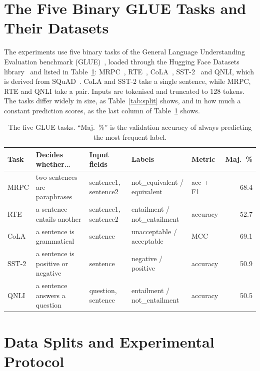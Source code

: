 \section{The Five Binary GLUE Tasks and Their Datasets}

The experiments use five binary tasks of the General Language Understanding Evaluation benchmark (GLUE)~\cite{wang2019glue}, loaded through the Hugging Face Datasets library~\cite{lhoest2021datasets} and listed in Table~\ref{tab:data}: MRPC~\cite{dolan2005mrpc}, RTE~\cite{dagan2006rte}, CoLA~\cite{warstadt2019cola}, SST-2~\cite{socher2013sst} and QNLI, which is derived from SQuAD~\cite{rajpurkar2016squad}. CoLA and SST-2 take a single sentence, while MRPC, RTE and QNLI take a pair. Inputs are tokenised and truncated to 128 tokens. The tasks differ widely in size, as Table~\ref{tab:split} shows, and in how much a constant prediction scores, as the last column of Table~\ref{tab:data} shows.

\begin{table}[htbp]
  \centering\tablestyle
  \caption{The five GLUE tasks. ``Maj.\ \%'' is the validation accuracy of always predicting the most frequent label.}
  \label{tab:data}
  \setlength{\tabcolsep}{3.5pt}\begin{tabularx}{\linewidth}{l X l l l r}
    \toprule
    Task & Decides whether\ldots & Input fields & Labels & Metric & Maj.\ \%\\
    \midrule
    MRPC & two sentences are paraphrases & sentence1, sentence2 & not\_equivalent / equivalent & acc + F1 & 68.4\\
    RTE & a sentence entails another & sentence1, sentence2 & entailment / not\_entailment & accuracy & 52.7\\
    CoLA & a sentence is grammatical & sentence & unacceptable / acceptable & MCC & 69.1\\
    SST-2 & a sentence is positive or negative & sentence & negative / positive & accuracy & 50.9\\
    QNLI & a sentence answers a question & question, sentence & entailment / not\_entailment & accuracy & 50.5\\
    \bottomrule
  \end{tabularx}
\end{table}

\section{Data Splits and Experimental Protocol}
\label{sec:protocol}

